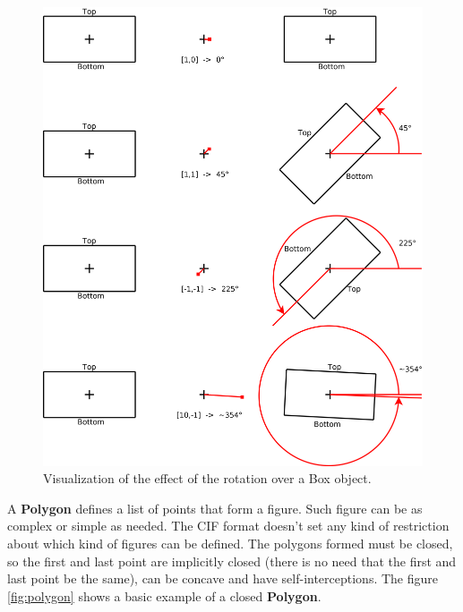 \documentclass[11pt,twoside,openany,x11names,svgnames]{memoir}
\begin{document}
\begin{figure}
	\centering
	\includegraphics[scale=0.1, clip=true, trim= 0pt 0pt 0pt 0pt]{images/chapter03-image03}
	\caption{Visualization of the effect of the rotation over a Box object.}
	\label{fig:boxrotation}
\end{figure}

A \textbf{Polygon} defines a list of points that form a figure. Such figure can be as complex or simple as needed. The CIF format doesn't set any kind of restriction about which kind of figures can be defined. The polygons formed must be closed, so the first and last point are implicitly closed (there is no need that the first and last point be the same), can be concave and have self-interceptions. The figure \ref{fig:polygon} shows a basic example of a closed \textbf{Polygon}.
\end{document}

